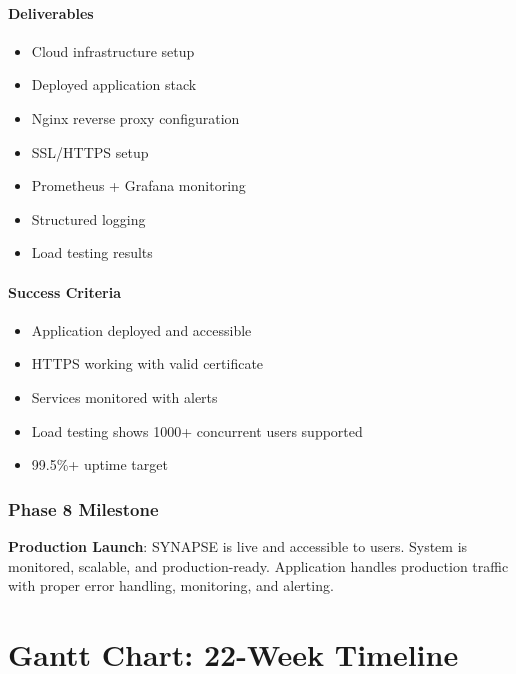 \documentclass[12pt,oneside]{report}
\begin{document}
\subsubsection{Deliverables}

\begin{itemize}
    \item Cloud infrastructure setup
    \item Deployed application stack
    \item Nginx reverse proxy configuration
    \item SSL/HTTPS setup
    \item Prometheus + Grafana monitoring
    \item Structured logging
    \item Load testing results
\end{itemize}

\subsubsection{Success Criteria}

\begin{itemize}
    \item Application deployed and accessible
    \item HTTPS working with valid certificate
    \item Services monitored with alerts
    \item Load testing shows 1000+ concurrent users supported
    \item 99.5\%+ uptime target
\end{itemize}

\subsection{Phase 8 Milestone}

\textbf{Production Launch}: SYNAPSE is live and accessible to users. System is monitored, scalable, and production-ready. Application handles production traffic with proper error handling, monitoring, and alerting.


\chapter{Gantt Chart: 22-Week Timeline}
\end{document}
